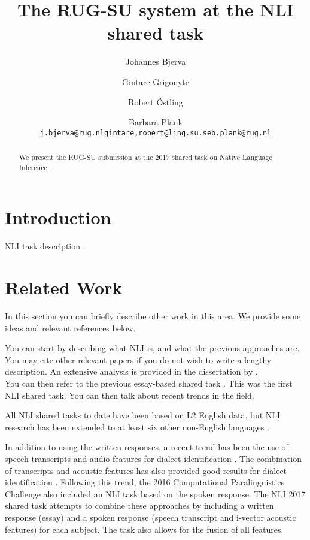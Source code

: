 \documentclass[11pt,letterpaper]{article}
\title{The RUG-SU system at the NLI shared task}
\author{Johannes Bjerva \and Gintar\.e Grigonyt\.e \and Robert {\"O}stling \and Barbara Plank \\
{\tt j.bjerva@rug.nl\hfill{gintare,robert}@ling.su.se\hfill b.plank@rug.nl}}
\date{}
\begin{document}
\maketitle

\begin{abstract}
    We present the RUG-SU submission at the 2017 shared task on Native
    Language Inference.
\end{abstract}


\section{Introduction}

NLI task description \citep{nli2017}.

\section{Related Work}

In this section you can briefly describe other work in this area. We provide some ideas and relevant references below.

You can start by describing what NLI is, and what the previous approaches are.
You may cite other relevant papers if you do not wish to write a lengthy description.
An extensive analysis is provided in the dissertation by .
\\

You can then refer to the previous essay-based shared task \cite{nli2013}. This was the first NLI shared task. You can then talk about recent trends in the field.

All NLI shared tasks to date have been based on L2 English data, but NLI research has been extended to at least six other non-English languages \cite{multilingual-nli}.

In addition to using the written responses, a recent trend has been the use of speech transcripts and audio features for dialect identification \cite{vardial2016}.
The combination of transcripts and acoustic features has also provided good results for dialect identification \cite{vardial2017}.
Following this trend, the 2016 Computational Paralinguistics Challenge \cite{compare2016} also included an NLI task based on the spoken response.
The NLI 2017 shared task attempts to combine these approaches by including a written response (essay) and a spoken response (speech transcript and i-vector acoustic features) for each subject. The task also allows for the fusion of all features.
\end{document}
